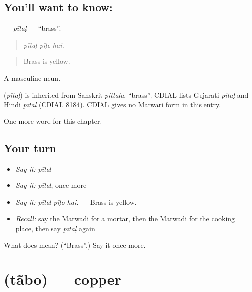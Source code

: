 \subsection*{You'll want to know: }
\textbf{} — \emph{pītaḷ} — \textquotedblleft{}brass\textquotedblright{}.

\begin{quote}
  
\end{quote}

\begin{quote}
\emph{pītaḷ pīḷo hai.}
\end{quote}

\begin{quote}
Brass is yellow.
\end{quote}

A masculine noun.

\begin{cousinweb}
\textbf{} (\emph{pītaḷ}) is inherited from Sanskrit \emph{pittala}, \textquotedblleft{}brass\textquotedblright{}; CDIAL lists Gujarati \emph{pitaḷ} and Hindi \emph{pītal} (CDIAL 8184). CDIAL gives no Marwari form in this entry.
\end{cousinweb}

\begin{grammarlens}[title={What you've built}]
One more word for this chapter.
\end{grammarlens}

\subsection*{Your turn}
\begin{itemize}
\raggedright
  \item \emph{Say it:} \emph{pītaḷ}
  \item \emph{Say it:} \emph{pītaḷ}, once more
  \item \emph{Say it:} \emph{pītaḷ pīḷo hai.} — Brass is yellow.
  \item \emph{Recall:} say the Marwadi for a mortar, then the Marwadi for the cooking place, then say \emph{pītaḷ} again
\end{itemize}

\begin{tcolorbox}[breakable,colback=teal!4,colframe=teal!35!black,title={Before you move on}]
What does  mean? (\textquotedblleft{}Brass\textquotedblright{}.) Say it once more.
\end{tcolorbox}
\section[\texorpdfstring{\mw{तांबो} (tā̃bo)}{तांबो (tā̃bo)}]{ (tā̃bo) — copper}

